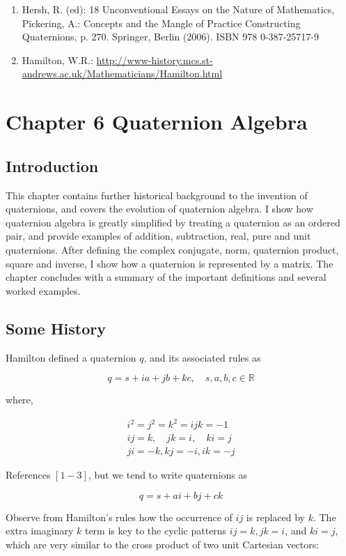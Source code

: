 \documentclass[10pt]{article}
\begin{document}
\begin{enumerate}
  \item Hersh, R. (ed): 18 Unconventional Essays on the Nature of Mathematics, Pickering, A.: Concepts and the Mangle of Practice Constructing Quaternions, p. 270. Springer, Berlin (2006). ISBN 978 0-387-25717-9

  \item Hamilton, W.R.: \href{http://www-history.mcs.st-andrews.ac.uk/Mathematicians/Hamilton.html}{http://www-history.mcs.st-andrews.ac.uk/Mathematicians/Hamilton.html}

\end{enumerate}

\section{Chapter 6
Quaternion Algebra}
\subsection{Introduction}
This chapter contains further historical background to the invention of quaternions, and covers the evolution of quaternion algebra. I show how quaternion algebra is greatly simplified by treating a quaternion as an ordered pair, and provide examples of addition, subtraction, real, pure and unit quaternions. After defining the complex conjugate, norm, quaternion product, square and inverse, I show how a quaternion is represented by a matrix. The chapter concludes with a summary of the important definitions and several worked examples.

\subsection{Some History}
Hamilton defined a quaternion $q$, and its associated rules as

$$
q=s+i a+j b+k c, \quad s, a, b, c \in \mathbb{R}
$$

where,

$$
\begin{gathered}
i^{2}=j^{2}=k^{2}=i j k=-1 \\
i j=k, \quad j k=i, \quad k i=j \\
j i=-k, k j=-i, i k=-j
\end{gathered}
$$

References $[1-3]$, but we tend to write quaternions as

$$
q=s+a i+b j+c k
$$

Observe from Hamilton's rules how the occurrence of $i j$ is replaced by $k$. The extra imaginary $k$ term is key to the cyclic patterns $i j=k, j k=i$, and $k i=j$, which are very similar to the cross product of two unit Cartesian vectors:
\end{document}

